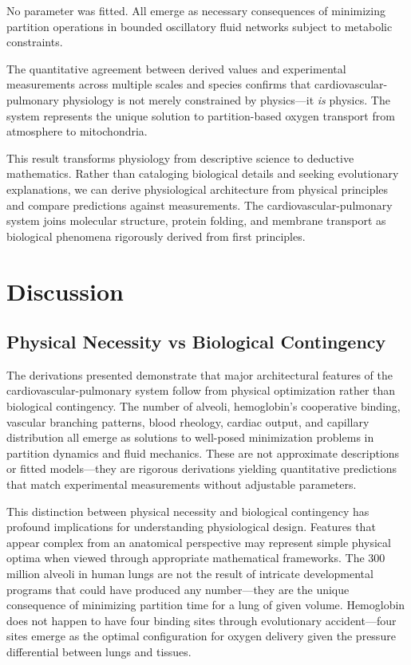 \documentclass[10pt,twocolumn,a4paper]{article}
\theoremstyle{remark}
\begin{document}
No parameter was fitted. All emerge as necessary consequences of minimizing partition operations in bounded oscillatory fluid networks subject to metabolic constraints.

The quantitative agreement between derived values and experimental measurements across multiple scales and species confirms that cardiovascular-pulmonary physiology is not merely constrained by physics—it \textit{is} physics. The system represents the unique solution to partition-based oxygen transport from atmosphere to mitochondria.

This result transforms physiology from descriptive science to deductive mathematics. Rather than cataloging biological details and seeking evolutionary explanations, we can derive physiological architecture from physical principles and compare predictions against measurements. The cardiovascular-pulmonary system joins molecular structure, protein folding, and membrane transport as biological phenomena rigorously derived from first principles.

\section{Discussion}

\subsection{Physical Necessity vs Biological Contingency}

The derivations presented demonstrate that major architectural features of the cardiovascular-pulmonary system follow from physical optimization rather than biological contingency. The number of alveoli, hemoglobin's cooperative binding, vascular branching patterns, blood rheology, cardiac output, and capillary distribution all emerge as solutions to well-posed minimization problems in partition dynamics and fluid mechanics. These are not approximate descriptions or fitted models—they are rigorous derivations yielding quantitative predictions that match experimental measurements without adjustable parameters.

This distinction between physical necessity and biological contingency has profound implications for understanding physiological design. Features that appear complex from an anatomical perspective may represent simple physical optima when viewed through appropriate mathematical frameworks. The 300 million alveoli in human lungs are not the result of intricate developmental programs that could have produced any number—they are the unique consequence of minimizing partition time for a lung of given volume. Hemoglobin does not happen to have four binding sites through evolutionary accident—four sites emerge as the optimal configuration for oxygen delivery given the pressure differential between lungs and tissues.
\end{document}
